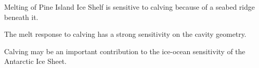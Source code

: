 \documentclass[draft]{agujournal2019}
\begin{document}




\begin{keypoints}
\item	Melting of Pine Island Ice Shelf is sensitive to calving because of a seabed ridge beneath it. 
\item	The melt response to calving has a strong sensitivity on the cavity geometry.
\item	Calving may be an important contribution to the ice-ocean sensitivity of the Antarctic Ice Sheet.
\end{keypoints}


%
%

%
%
\newcommand{\mpryr}{~m~yr\textsuperscript{-1}}


\end{document}
